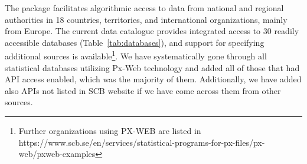 


The package facilitates algorithmic access to data from national and
regional authorities in 18 countries, territories, and international
organizations, mainly from Europe. The current data catalogue provides
integrated access to 30 readily accessible databases
(Table~\ref{tab:databases}), and support for specifying additional
sources is available\footnote{Further organizations using PX-WEB are
listed in
https://www.scb.se/en/services/statistical-programs-for-px-files/px-web/pxweb-examples}. We have systematically gone through all statistical databases utilizing Px-Web technology and added all of those that had API access enabled, which was the majority of them. Additionally, we have added also APIs not listed in SCB website if we have come across them from other sources.

